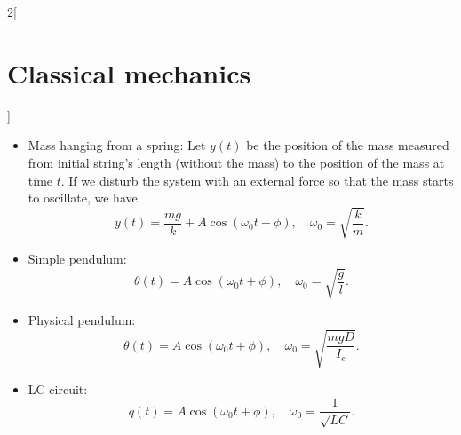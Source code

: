\documentclass[class=article,10pt,crop=false]{standalone}
\begin{document}
\begin{multicols}{2}[\section{Classical mechanics}]
\begin{concept}
\end{concept}
\begin{concept}[Examples]
\hfill
\begin{itemize}
    \item Mass hanging from a spring: Let $y(t)$ be the position of the mass measured from initial string's length (without the mass) to the position of the mass at time $t$. If we disturb the system with an external force so that the mass starts to oscillate, we have $$y(t)=\frac{mg}{k}+A\cos(\omega_0t+\phi),\quad\omega_0=\sqrt{\frac{k}{m}}.$$
    \begin{figure}[ht]
        \centering
    \end{figure} 
    \item Simple pendulum: $$\theta(t)=A\cos(\omega_0t+\phi),\quad\omega_0=\sqrt{\frac{g}{l}}.$$
    \begin{figure}[ht]
        \centering
    \end{figure} 
    \item Physical pendulum: 
    $$\theta(t)=A\cos(\omega_0t+\phi),\quad\omega_0=\sqrt{\frac{mgD}{I_e}}.$$
    \begin{figure}[ht] 
        \centering 
    \end{figure} 
    \item LC circuit: $$q(t)=A\cos(\omega_0t+\phi),\quad\omega_0=\frac{1}{\sqrt{LC}}.$$
\end{itemize}
\end{concept}

\end{multicols}
\end{document}
